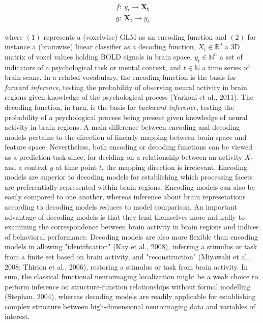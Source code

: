 \documentclass[authoryear,review,3p]{elsarticle}
\begin{document}
\begin{eqnarray}
  f\colon\ y_t \to \mathbf{X_t}\\
  g\colon\ \mathbf{X_t} \to y_t
\end{eqnarray}

where $(1)$ represents a (voxelwise) GLM as an encoding function and
$(2)$ for instance a (brainwise) linear classifier as a decoding function,
$X_t \in \mathbb{R}^{d}$ a 3D matrix of voxel values holding BOLD signals
in brain space,
$y_t \in \mathbb{N}^n$ a set of indicators of a psychological task or
mental context, and $t \in \mathbb{N}$ a time series of brain scans.
In a related vocabulary,
the encoding function is the basis for \textit{forward inference},
testing the probability of observing
neural activity in brain regions given knowledge of the psychological process
(Yarkoni et al., 2011).
The decoding function, in turn, is the basis for
\textit{backward inference},
testing the probability of a psychological process
being present given knowledge of neural activity in brain regions.
A main difference between encoding and decoding models pertains to
the direction of linearly mapping between brain space and feature space.
Nevertheless,
both encoding or decoding functions
can be viewed as a prediction task since,
for deciding on a relationship between an activity $X_t$ and a
context $y$ at time point $t$, the mapping direction is irrelevant.
Encoding models are superior to decoding models for
establishing which processing facets are preferentially
represented within brain regions.
Encoding models can also be easily compared to one another,
whereas
inference about brain represetations according to decoding models
reduces to model comparison.
An important advantage of decoding models is that
they lend themselves more naturally to examining the
correspondence between
brain activity in brain regions and indices of behavioral performance.
Decoding models are also more flexible than encoding models
in allowing
"identification" (Kay et al., 2008),
inferring a stimulus or task from a finite set based on brain activity,
and
"reconstruction" (Miyawaki et al., 2008; Thirion et al., 2006),
restoring a stimulus or task from brain activity.
%
In sum,
the classical functional neuroimaging localization
might be a weak choice to perform inference on
structure-function relationships
without formal modelling (Stephan, 2004),
whereas
decoding models are
readily applicable
for establishing complex structure between
high-dimensional neuroimaging data
and variables of interest.
\end{document}
